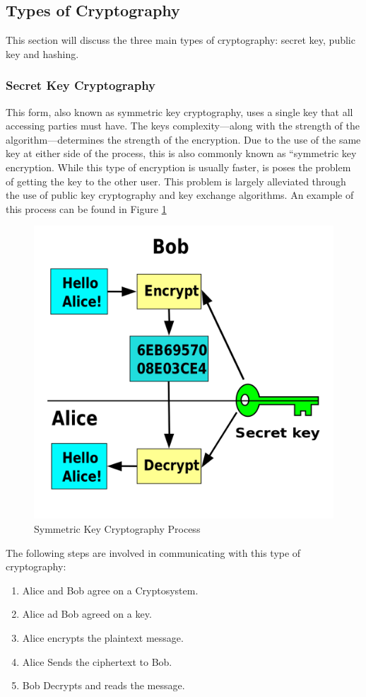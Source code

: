 		\subsection{Types of Cryptography}
			This section will discuss the three main types of cryptography: secret key, public key and hashing. 
			\subsubsection{Secret Key Cryptography}
				This form, also known as symmetric key cryptography,  uses a single key that all accessing parties must have. 
				The keys complexity---along with the strength of the algorithm---determines the strength of the encryption.
				Due to the use of the same key at either side of the process, this is also commonly known as ``symmetric key encryption. 
				While this type of encryption is usually faster, is poses the problem of getting the key to the other user. 
				This problem is largely alleviated through the use of public key cryptography and key exchange algorithms.
				An example of this process can be found in Figure \ref{fig:SymmetricKey}
				\begin{figure}[htb]
					\centering
					\includegraphics[scale=0.25]{./SymmetricKey.png}
					\caption{Symmetric Key Cryptography Process}
					\label{fig:SymmetricKey}
				\end{figure}
				The following steps are involved in communicating with this type of cryptography:
				\begin{enumerate}
					\item Alice and Bob agree on a Cryptosystem. 
					\item Alice ad Bob agreed on a key. 
					\item Alice encrypts the plaintext message. 
					\item Alice Sends the ciphertext to Bob. 
					\item Bob Decrypts and reads the message.
				\end{enumerate}

